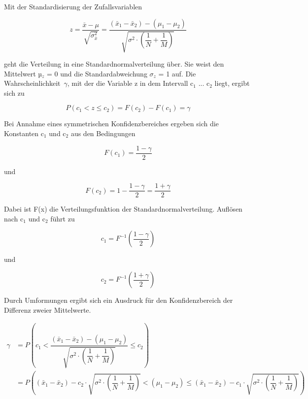 \noindent Mit der Standardisierung der Zufallsvariablen

\begin{equation}\label{eq:fivesixtyfive}
z=\dfrac{\bar{x}-\mu }{\sqrt{\sigma _{\bar{x}}^{2} } } =\dfrac{\left(\bar{x}_{1} -\bar{x}_{2} \right)-\left(\mu _{1} -\mu _{2} \right)}{\sqrt{\sigma ^{2} \cdot \left(\dfrac{1}{N} +\dfrac{1}{M} \right)} }
\end{equation}

\noindent geht die Verteilung in eine Standardnormalverteilung \"{u}ber. Sie weist den Mittelwert µ$_{z}$ = 0 und die Standardabweichung $\sigma_{z}$ = 1 auf. Die Wahrscheinlichkeit~$\gamma$, mit der die Variable z in dem Intervall c$_{1}$ ... c$_{2}$ liegt, ergibt sich zu

\begin{equation}\label{eq:fivesixtysix}
P\left(c_{1} <z\le c_{2} \right)=F(c_{2} )-F(c_{1} )=\gamma
\end{equation}

\noindent Bei Annahme eines symmetrischen Konfidenzbereiches ergeben sich die Konstanten c$_{1}$ und c$_{2}$ aus den Bedingungen

\begin{equation}\label{eq:fivesixtyseven}
F(c_{1})=\dfrac{1-\gamma}{2}
\end{equation}

\noindent und 

\begin{equation}\label{eq:fivesixtyeight}
F(c_{2})=1-\dfrac{1-\gamma}{2} =\dfrac{1+\gamma}{2}
\end{equation}

\noindent Dabei ist F(x) die Verteilungsfunktion der Standardnormalverteilung. Aufl\"{o}sen nach c$_{1}$ und c$_{2}$ f\"{u}hrt zu

\begin{equation}\label{eq:fivesixtynine}
c_{1} =F^{-1} \left(\dfrac{1-\gamma }{2} \right)
\end{equation}

\noindent und

\begin{equation}\label{eq:fiveseventy}
c_{2} =F^{-1} \left(\dfrac{1+\gamma }{2} \right)
\end{equation}

\noindent Durch Umformungen ergibt sich ein Ausdruck f\"{u}r den Konfidenzbereich der Differenz zweier Mittelwerte.

\begin{equation}\label{eq:fiveseventyone}
\begin{split}
\gamma & = P\left(c_{1} <\dfrac{\left(\bar{x}_{1} -\bar{x}_{2} \right)-\left(\mu _{1} -\mu _{2} \right)}{\sqrt{\sigma ^{2} \cdot \left(\dfrac{1}{N} +\dfrac{1}{M} \right)} } \le c_{2} \right) \\ 
& = P\left(\left(\bar{x}_{1} -\bar{x}_{2} \right)-c_{2} \cdot \sqrt{\sigma ^{2} \cdot \left(\dfrac{1}{N} +\dfrac{1}{M} \right)} <\left(\mu _{1} -\mu _{2} \right)\le \left(\bar{x}_{1} -\bar{x}_{2} \right)-c_{1} \cdot \sqrt{\sigma ^{2} \cdot \left(\dfrac{1}{N} +\dfrac{1}{M} \right)} \right)
\end{split}
\end{equation}

